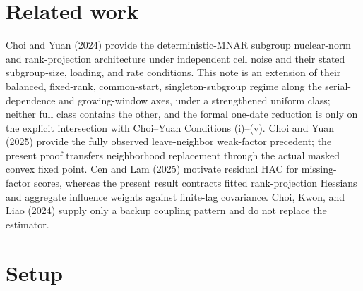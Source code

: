 \documentclass{article}
\begin{document}
\section{Related work}

Choi and Yuan (2024) provide the deterministic-MNAR subgroup nuclear-norm and rank-projection architecture under independent cell noise and their stated subgroup-size, loading, and rate conditions. This note is an extension of their balanced, fixed-rank, common-start, singleton-subgroup regime along the serial-dependence and growing-window axes, under a strengthened uniform class; neither full class contains the other, and the formal one-date reduction is only on the explicit intersection with Choi--Yuan Conditions (i)--(v). Choi and Yuan (2025) provide the fully observed leave-neighbor weak-factor precedent; the present proof transfers neighborhood replacement through the actual masked convex fixed point. Cen and Lam (2025) motivate residual HAC for missing-factor scores, whereas the present result contracts fitted rank-projection Hessians and aggregate influence weights against finite-lag covariance. Choi, Kwon, and Liao (2024) supply only a backup coupling pattern and do not replace the estimator.

\section{Setup}
\end{document}
